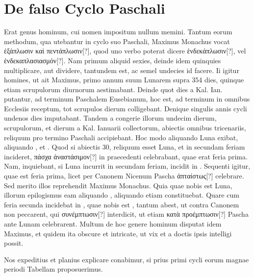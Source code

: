 \section{De falso Cyclo Paschali}
%
Erat genus hominum, cui nomen impositum nullum memini.
Tantum eorum methodum, qua utebantur in cyclo suo Paschali,
Maximus Monachus vocat \textgreek{ἑξάπλωσιν καὶ πεντάπλωσιν[?]}, quod uno verbo
poterat dicere \textgreek{ἑνδεκάπλωσιν[?]}, vel \textgreek{ἑνδεκαπλασιασμόν[?]}.
Nam primum
aliquid sexies, deinde idem quinquies multiplicare, aut dividere, tantundem
est, ac semel undecies id facere.
Ii igitur homines, ut ait Maximus,
primo annum suum Lunarem supra 354 dies, quinque etiam
scrupulorum diurnorum aestimabant.
Deinde quot dies a Kal. Ian. %
putantur, ad terminum Paschalem Eusebianum, hoc est, ad terminum
in omnibus Ecclesiis receptum, tot scrupulos dierum colligebant.
Denique singulis annis cycli undenos dies imputabant.
Tandem a
congerie illorum undecim dierum, scrupulorum, et dierum a Kal. %
Ianuarii collectorum, abiectis omnibus tricenariis, reliquum pro termino
Paschali accipiebant.
%
Hoc modo aliquando  Luna exibat,
aliquando , et .
Quod si abiectis 30, reliquum esset
 Luna, et in secundam feriam incideret,
 \textgreek{πάσχα ἀναστάσιμον[?]} in praecedenti
celebrabant, quae erat feria prima.
Nam, inquiebant, si 
Luna incurrit in secundam feriam,  incidit in .
Sequenti
igitur, quae est feria prima, licet per Canonem Nicenum Pascha 
 \textgreek{ἀπταίστως[?]}
celebrare.
Sed merito illos reprehendit Maximus Monachus.
Quia quae nobis est  Luna, illorum epilogismus eam aliquando
, aliquando etiam  constituebat.
Quare cum feria secunda
incidebat in , quae nobis est , tantum abest, ut contra
Canonem non peccarent, qui \textgreek{συνέμπτωσιν[?]} interdicit, ut etiam
 \textgreek{κατὰ προέμπτωσιν[?]}
Pascha ante  Lunam celebrarent.
Multum de hoc genere
hominum disputat idem Maximus, et quidem ita obscure et intricate,
ut vix et a doctis ipsis intelligi
possit.
\begin{table}[tb]
  
\end{table}
%
Nos expeditius et
planius explicare conabimur, si
prius primi cycli eorum magnae
periodi Tabellam proposuerimus.
